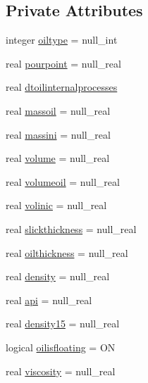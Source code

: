 \subsection*{Private Attributes}
\begin{DoxyCompactItemize}
\item 
integer \mbox{\hyperlink{structmoduleoil_1_1t__var_a4a0d09da4435238d541efc167ee87ad4}{oiltype}} = null\+\_\+int
\item 
real \mbox{\hyperlink{structmoduleoil_1_1t__var_aa1a2d8d854096b39e0967d2c184aabc6}{pourpoint}} = null\+\_\+real
\item 
real \mbox{\hyperlink{structmoduleoil_1_1t__var_a6b09cb9abe8f376012fd5892e9cd9659}{dtoilinternalprocesses}}
\item 
real \mbox{\hyperlink{structmoduleoil_1_1t__var_ae899fd54b9c8732c9b6f755c38da569c}{massoil}} = null\+\_\+real
\item 
real \mbox{\hyperlink{structmoduleoil_1_1t__var_a6913ce0891156db5fccfd8bfed6b974e}{massini}} = null\+\_\+real
\item 
real \mbox{\hyperlink{structmoduleoil_1_1t__var_a92acfd5ba295243cccc667019d59858c}{volume}} = null\+\_\+real
\item 
real \mbox{\hyperlink{structmoduleoil_1_1t__var_add48a6bdfc83032667ae3984b3cdb3d1}{volumeoil}} = null\+\_\+real
\item 
real \mbox{\hyperlink{structmoduleoil_1_1t__var_a41c262f35c7f1ba58377ff4426ecab8d}{volinic}} = null\+\_\+real
\item 
real \mbox{\hyperlink{structmoduleoil_1_1t__var_a0e3d9eeec9681f1fe067c760e4b5494c}{slickthickness}} = null\+\_\+real
\item 
real \mbox{\hyperlink{structmoduleoil_1_1t__var_ad489f9b0e0dbbf3cbd5aa8ebe59f7981}{oilthickness}} = null\+\_\+real
\item 
real \mbox{\hyperlink{structmoduleoil_1_1t__var_a374612cc85353b818dab653d237cd477}{density}} = null\+\_\+real
\item 
real \mbox{\hyperlink{structmoduleoil_1_1t__var_a75506c880fc27d71133212a17a8fe240}{api}} = null\+\_\+real
\item 
real \mbox{\hyperlink{structmoduleoil_1_1t__var_a98308bef9c4a2d549c82ec03a85edad2}{density15}} = null\+\_\+real
\item 
logical \mbox{\hyperlink{structmoduleoil_1_1t__var_a7b18119af3f03f9bd75e3edbbc8e0992}{oilisfloating}} = ON
\item 
real \mbox{\hyperlink{structmoduleoil_1_1t__var_a23a8a67c86ea14b3d015cd6665d97b15}{viscosity}} = null\+\_\+real

\end{DoxyCompactItemize}
